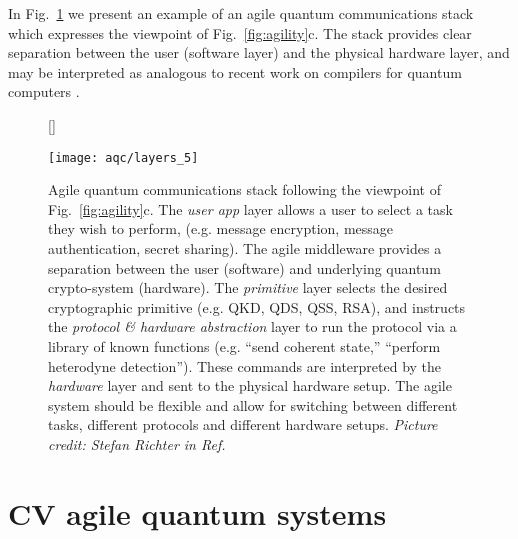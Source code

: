 
In Fig.~\ref{fig:big_agile} we present an example of an agile quantum communications stack which expresses the viewpoint of Fig.~\ref{fig:agility}c. The stack provides clear separation between the user (software layer) and the physical hardware layer, and may be interpreted as analogous to recent work on compilers for quantum computers \cite{Killoran2018, qiskit, Murali2019}.

\begin{figure}[htp]
[\FBwidth]
{\caption{\label{fig:big_agile} Agile quantum communications stack following the viewpoint of Fig.~\ref{fig:agility}c. The \emph{user app} layer allows a user to select a task they wish to perform, (e.g. message encryption, message authentication, secret sharing). The agile middleware provides a separation between the user (software) and underlying quantum crypto-system (hardware). The \emph{primitive} layer selects the desired cryptographic primitive (e.g. QKD, QDS, QSS, RSA), and instructs the \emph{protocol \& hardware abstraction} layer to run the protocol via a library of known functions (e.g. ``send coherent state,'' ``perform heterodyne detection''). These commands are interpreted by the \emph{hardware} layer and sent to the physical hardware setup. The agile system should be flexible and allow for switching between different tasks, different protocols and different hardware setups. \emph{Picture credit: Stefan Richter in Ref.~\cite{Richter2020}}}}
{\texttt{[image: aqc/layers\_5]}}
\end{figure}




\clearpage
\section{CV agile quantum systems}

